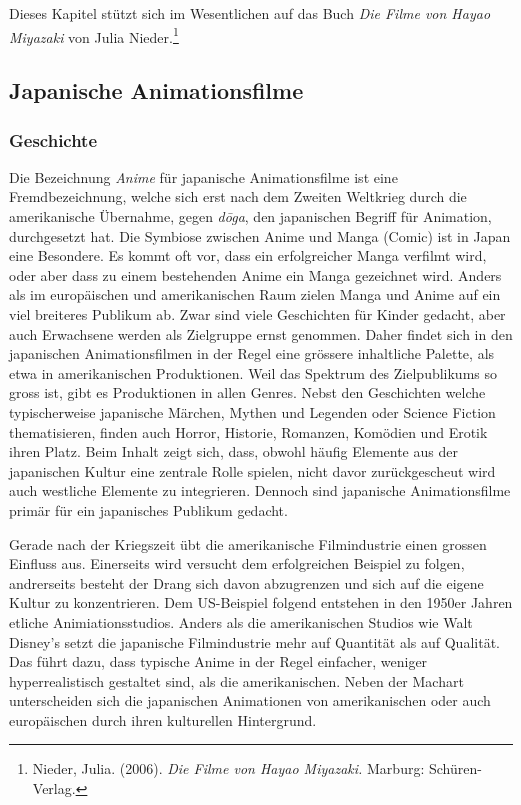 Dieses Kapitel stützt sich im Wesentlichen auf das Buch \emph{Die Filme von Hayao Miyazaki} von Julia Nieder.\footnote{Nieder, Julia. (2006). \emph{Die Filme von Hayao Miyazaki.}	Marburg: Schüren-Verlag.}

\subsection{Japanische Animationsfilme}
\subsubsection{Geschichte}
Die Bezeichnung \emph{Anime} für japanische Animationsfilme ist eine Fremdbezeichnung, welche sich erst nach dem Zweiten Weltkrieg durch die amerikanische Übernahme, gegen \emph{d\={o}ga}, den japanischen Begriff für Animation, durchgesetzt hat. Die Symbiose zwischen Anime und Manga (Comic) ist in Japan eine Besondere. Es kommt oft vor, dass ein erfolgreicher Manga verfilmt wird, oder aber dass zu einem bestehenden Anime ein Manga gezeichnet wird. 
Anders als im europäischen und amerikanischen Raum zielen Manga und Anime auf ein viel breiteres Publikum ab. Zwar sind viele Geschichten für Kinder gedacht, aber auch Erwachsene werden als Zielgruppe ernst genommen. Daher findet sich in den japanischen Animationsfilmen in der Regel eine grössere inhaltliche Palette, als etwa in amerikanischen Produktionen. Weil das Spektrum des Zielpublikums so gross ist, gibt es Produktionen in allen Genres. Nebst den Geschichten welche typischerweise japanische Märchen, Mythen und Legenden oder Science Fiction thematisieren, finden auch Horror, Historie, Romanzen, Komödien und Erotik ihren Platz. Beim Inhalt zeigt sich, dass, obwohl häufig Elemente aus der japa\-nischen Kultur eine zentrale Rolle spielen, nicht davor zurückgescheut wird auch westliche Elemente zu integrieren. Dennoch sind japanische Animationsfilme primär für ein japa\-nisches Publikum gedacht. 

Gerade nach der Kriegszeit übt die amerikanische Filmindustrie einen grossen Einfluss aus. Einerseits wird versucht dem erfolgreichen Beispiel zu folgen, andrer\-seits besteht der Drang sich davon abzugrenzen und sich auf die eigene Kultur zu konzentrieren. Dem US-Beispiel folgend entstehen in den 1950er Jahren etliche Animiationsstudios. Anders als die amerikanischen Studios wie Walt Disney's setzt die japanische Filmindustrie mehr auf Quantität als auf Qualität. Das führt dazu, dass typische Anime in der Regel einfacher, weniger hyperrealistisch gestaltet sind, als die amerikanischen. Neben der Machart unterscheiden sich die japanischen Animationen von amerikanischen oder auch europäischen durch ihren kulturellen Hintergrund. 

